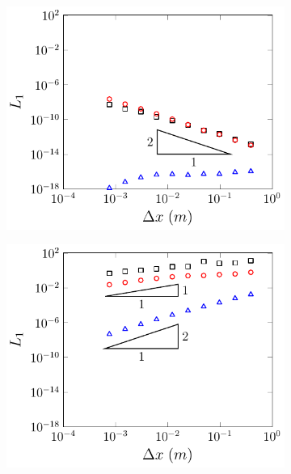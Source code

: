 \begin{figure}
	\centering
	\begin{subfigure}{0.5\textwidth}
		\includegraphics[width=\textwidth]{./chp5/figures/Analytic/LakeAtRest/L1/FEVMWB.pdf}
		\vspace{0.5cm}
	\end{subfigure}%
	\begin{subfigure}{0.5\textwidth}
		\includegraphics[width=\textwidth]{./chp5/figures/Analytic/LakeAtRest/L1/FEVMnWB.pdf}
		\vspace{0.5cm}

\end{subfigure}
\end{figure}
